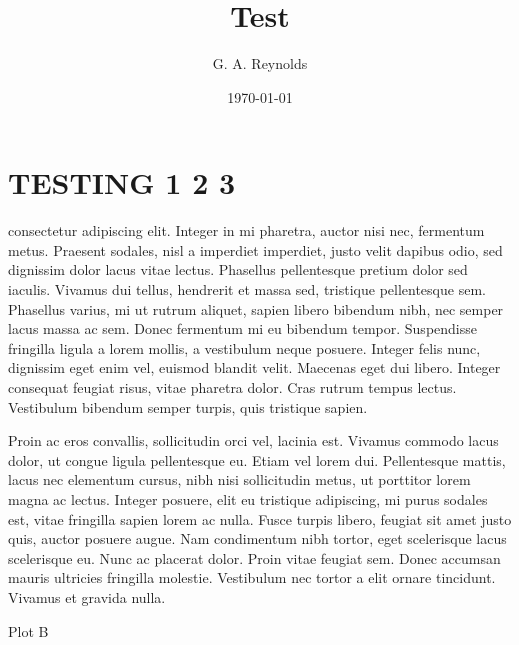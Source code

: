 \documentclass{tufte-handout}
\title{Test}
\author{G. A. Reynolds}
\date{\today}
\begin{document}
\maketitle
\nocite{*}

\tableofcontents

\section{TESTING 1 2 3}







 consectetur adipiscing elit. Integer in mi pharetra, auctor nisi nec, fermentum metus. Praesent sodales, nisl a imperdiet imperdiet, justo velit dapibus odio, sed dignissim dolor lacus vitae lectus. Phasellus pellentesque pretium dolor sed iaculis. Vivamus dui tellus, hendrerit et massa sed, tristique pellentesque sem. Phasellus varius, mi ut rutrum aliquet, sapien libero bibendum nibh, nec semper lacus massa ac sem. Donec fermentum mi eu bibendum tempor. Suspendisse fringilla ligula a lorem mollis, a vestibulum neque posuere. Integer felis nunc, dignissim eget enim vel, euismod blandit velit. Maecenas eget dui libero. Integer consequat feugiat risus, vitae pharetra dolor. Cras rutrum tempus lectus. Vestibulum bibendum semper turpis, quis tristique sapien.


\begin{figure}[h!]
\end{figure}

Proin ac eros convallis, sollicitudin orci vel, lacinia est. Vivamus commodo lacus dolor, ut congue ligula pellentesque eu. Etiam vel lorem dui. Pellentesque mattis, lacus nec elementum cursus, nibh nisi sollicitudin metus, ut porttitor lorem magna ac lectus. Integer posuere, elit eu tristique adipiscing, mi purus sodales est, vitae fringilla sapien lorem ac nulla. Fusce turpis libero, feugiat sit amet justo quis, auctor posuere augue. Nam condimentum nibh tortor, eget scelerisque lacus scelerisque eu. Nunc ac placerat dolor. Proin vitae feugiat sem. Donec accumsan mauris ultricies fringilla molestie. Vestibulum nec tortor a elit ornare tincidunt. Vivamus et gravida nulla.

\pgfplotsset{width=5cm,compat=1.9}
\begin{marginfigure}
\caption{Plot B}
\end{marginfigure}
\end{document}

